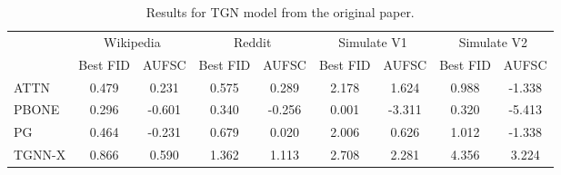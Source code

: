 \begin{table}
\centering
\begin{tabular}{lcccccccc}
\toprule
 & \multicolumn{2}{c}{Wikipedia} & \multicolumn{2}{c}{Reddit} & \multicolumn{2}{c}{Simulate V1} & \multicolumn{2}{c}{Simulate V2} \\
 & Best FID & AUFSC & Best FID & AUFSC & Best FID & AUFSC & Best FID & AUFSC \\
\midrule
ATTN & 0.479 & 0.231 & 0.575 & 0.289 & 2.178 & 1.624 & 0.988 & -1.338 \\
PBONE & 0.296 & -0.601 & 0.340 & -0.256 & 0.001 & -3.311 & 0.320 & -5.413 \\
PG & 0.464 & -0.231 & 0.679 & 0.020 & 2.006 & 0.626 & 1.012 & -1.338 \\
TGNN-X & 0.866 & 0.590 & 1.362 & 1.113 & 2.708 & 2.281 & 4.356 & 3.224 \\
\bottomrule
\end{tabular}
\caption{\label{tab:tgn_results_og}Results for TGN model from the original paper.}
\end{table}
